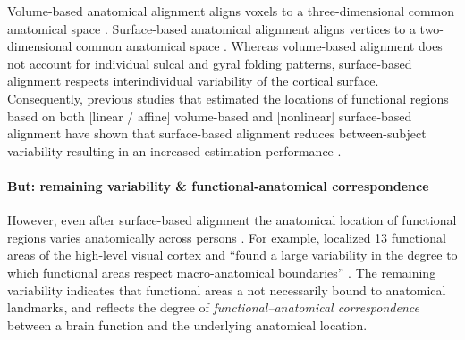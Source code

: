 Volume-based anatomical alignment \citep[s.][for a review]{klein2009evaluation}
aligns voxels to a three-dimensional common anatomical space \citep[e.g., MNI152
atlas;][]{fonov2011unbiased}.
Surface-based anatomical alignment \citep{fischl1999cortical, yeo2009spherical}
aligns vertices to a two-dimensional common anatomical space \citep[e.g.,
FreeSurfer fsaverage template;][]{fischl1999high}.
Whereas volume-based alignment does not account for individual sulcal and gyral
folding patterns, surface-based alignment respects interindividual variability
of the cortical surface.
Consequently, previous studies that estimated the locations of functional
regions based on both [linear / affine] volume-based and [nonlinear]
surface-based alignment have shown that surface-based alignment reduces
between-subject variability resulting in an increased estimation performance
\citep{rosenke2021probabilistic, frost2012measuring, wang2015probabilistic,
weiner2018defining}.


\paragraph{But: remaining variability \& functional-anatomical correspondence}

However, even after surface-based alignment the anatomical location of
functional regions varies anatomically across persons
\citep[e.g.,][]{coalson2018impact, benson2014correction, natu2021sulcal,
wang2015probabilistic, frost2012measuring, langers2014assessment, weiner2014mid,
rosenke2021probabilistic}.
For example, \citet{frost2012measuring} localized 13 functional areas of the
high-level visual cortex and ``found a large variability in the degree to which
functional areas respect macro-anatomical boundaries''
\citep{frost2012measuring}.
The remaining variability indicates that functional areas a not necessarily
bound to anatomical landmarks, and reflects the degree of
\textit{functional--anatomical correspondence} between a brain function and the
underlying anatomical location.




